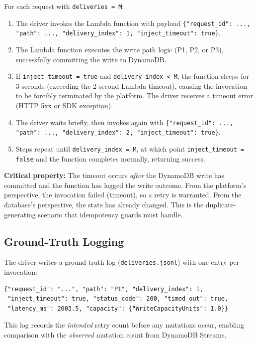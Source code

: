 For each request with \texttt{deliveries = M}:

\begin{enumerate}
    \item The driver invokes the Lambda function with payload \texttt{\{"request\_id": ..., "path": ..., "delivery\_index": 1, "inject\_timeout": true\}}.
    \item The Lambda function executes the write path logic (P1, P2, or P3), successfully committing the write to DynamoDB.
    \item If \texttt{inject\_timeout = true} and \texttt{delivery\_index < M}, the function sleeps for 3 seconds (exceeding the 2-second Lambda timeout), causing the invocation to be forcibly terminated by the platform. The driver receives a timeout error (HTTP 5xx or SDK exception).
    \item The driver waits briefly, then invokes again with \texttt{\{"request\_id": ..., "path": ..., "delivery\_index": 2, "inject\_timeout": true\}}.
    \item Steps repeat until \texttt{delivery\_index = M}, at which point \texttt{inject\_timeout = false} and the function completes normally, returning success.
\end{enumerate}

\textbf{Critical property:} The timeout occurs \textit{after} the DynamoDB write has committed and the function has logged the write outcome. From the platform's perspective, the invocation failed (timeout), so a retry is warranted. From the database's perspective, the state has already changed. This is the duplicate-generating scenario that idempotency guards must handle.

\subsection{Ground-Truth Logging}

The driver writes a ground-truth log (\texttt{deliveries.jsonl}) with one entry per invocation:

\begin{verbatim}
{"request_id": "...", "path": "P1", "delivery_index": 1, 
 "inject_timeout": true, "status_code": 200, "timed_out": true, 
 "latency_ms": 2003.5, "capacity": {"WriteCapacityUnits": 1.0}}
\end{verbatim}

This log records the \textit{intended} retry count before any mutations occur, enabling comparison with the \textit{observed} mutation count from DynamoDB Streams.

